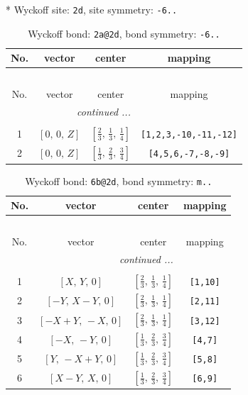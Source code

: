 \documentclass[fleqn,8pt]{jsarticle}
\begin{document}
* Wyckoff site: {\tt 2d}, site symmetry: {\tt -6..}
\renewcommand{\arraystretch}{1.2}
\begin{longtable}{cccc}
\caption{Wyckoff bond: {\tt 2a@2d}, bond symmetry: {\tt -6..}}
 \\
 \hline \hline
No. & vector & center & mapping \\ \hline \endfirsthead

\multicolumn{3}{l}{\tablename\ \thetable{}} \\
 \hline \hline
No. & vector & center & mapping \\ \hline \endhead

 \hline \hline
\multicolumn{3}{r}{\footnotesize\it continued ...} \\ \endfoot

 \hline \hline
\multicolumn{3}{r}{} \\ \endlastfoot

1 & $\left[ 0,\, 0,\, Z \right]$ & $\left[ \frac{2}{3},\, \frac{1}{3},\, \frac{1}{4} \right]$ & {\tt [1,2,3,-10,-11,-12]} \\ \hline
2 & $\left[ 0,\, 0,\, Z \right]$ & $\left[ \frac{1}{3},\, \frac{2}{3},\, \frac{3}{4} \right]$ & {\tt [4,5,6,-7,-8,-9]} \\
\end{longtable}
\renewcommand{\arraystretch}{1.2}
\begin{longtable}{cccc}
\caption{Wyckoff bond: {\tt 6b@2d}, bond symmetry: {\tt m..}}
 \\
 \hline \hline
No. & vector & center & mapping \\ \hline \endfirsthead

\multicolumn{3}{l}{\tablename\ \thetable{}} \\
 \hline \hline
No. & vector & center & mapping \\ \hline \endhead

 \hline \hline
\multicolumn{3}{r}{\footnotesize\it continued ...} \\ \endfoot

 \hline \hline
\multicolumn{3}{r}{} \\ \endlastfoot

1 & $\left[ X,\, Y,\, 0 \right]$ & $\left[ \frac{2}{3},\, \frac{1}{3},\, \frac{1}{4} \right]$ & {\tt [1,10]} \\ \hline
2 & $\left[ - Y,\, X - Y,\, 0 \right]$ & $\left[ \frac{2}{3},\, \frac{1}{3},\, \frac{1}{4} \right]$ & {\tt [2,11]} \\ \hline
3 & $\left[ - X + Y,\, - X,\, 0 \right]$ & $\left[ \frac{2}{3},\, \frac{1}{3},\, \frac{1}{4} \right]$ & {\tt [3,12]} \\ \hline
4 & $\left[ - X,\, - Y,\, 0 \right]$ & $\left[ \frac{1}{3},\, \frac{2}{3},\, \frac{3}{4} \right]$ & {\tt [4,7]} \\ \hline
5 & $\left[ Y,\, - X + Y,\, 0 \right]$ & $\left[ \frac{1}{3},\, \frac{2}{3},\, \frac{3}{4} \right]$ & {\tt [5,8]} \\ \hline
6 & $\left[ X - Y,\, X,\, 0 \right]$ & $\left[ \frac{1}{3},\, \frac{2}{3},\, \frac{3}{4} \right]$ & {\tt [6,9]} \\
\end{longtable}
\end{document}
